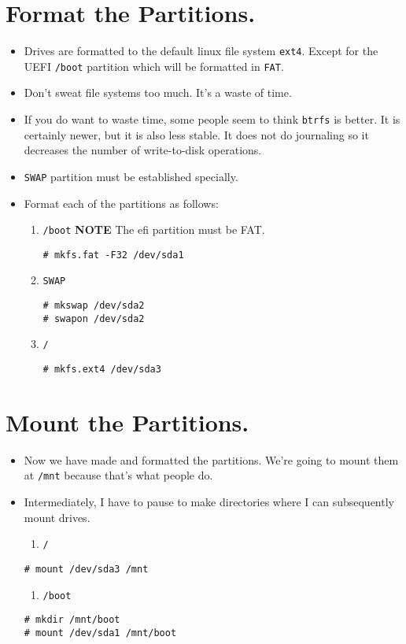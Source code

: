 \documentclass{article}
\begin{document}
\section{Format the Partitions.}
\begin{itemize}
  \item Drives are formatted to the default linux file system \verb|ext4|.
    Except for the UEFI \verb|/boot| partition which will be formatted in \verb|FAT|.
  \item Don't sweat file systems too much.
    It's a waste of time.
  \item If you do want to waste time, some people seem to think \verb|btrfs| is better.
    It is certainly newer, but it is also less stable.
    It does not do journaling so it decreases the number of write-to-disk operations.
  \item \verb|SWAP| partition must be established specially.
  \item Format each of the partitions as follows:
  \begin{enumerate}
    \item \verb|/boot| \textbf{NOTE} The efi partition must be FAT.
\begin{verbatim}
# mkfs.fat -F32 /dev/sda1
\end{verbatim}
    \item \verb|SWAP|
\begin{verbatim}
# mkswap /dev/sda2
# swapon /dev/sda2
\end{verbatim}
    \item \verb|/|
\begin{verbatim}
# mkfs.ext4 /dev/sda3
\end{verbatim}
  \end{enumerate}
\end{itemize}

\section{Mount the Partitions.}

\begin{itemize}
  \item Now we have made and formatted the partitions.
    We're going to mount them at \verb|/mnt| because that's what people do.
  \item Intermediately, I have to pause to make directories where I can subsequently mount drives.
  \begin{enumerate}
    \item \verb|/|
  \end{enumerate}
\begin{verbatim}
# mount /dev/sda3 /mnt
\end{verbatim}
  \begin{enumerate}
    \item \verb|/boot|
  \end{enumerate}
\begin{verbatim}
# mkdir /mnt/boot
# mount /dev/sda1 /mnt/boot
\end{verbatim}
\end{itemize}
\end{document}
